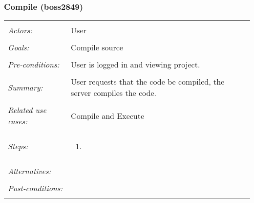 \documentclass[11pt]{article}
\begin{document}
\subsubsection{Compile (boss2849)}
\begin{tabular}{ p{2cm} p{12cm} }
 \hline
 \\
 \textit{Actors:} & User \\ 
 \\
 \textit{Goals:} & Compile source \\
 \\
 \textit{Pre-conditions:} & User is logged in and viewing project. \\
 \\
 \textit{Summary:} & User requests that the code be compiled, the server compiles the code. \\
 \\
 \textit{Related use cases:} & Compile and Execute \\ 
 \\
 \textit{Steps:} & \begin{enumerate}
  \item 
 \end{enumerate} \\
 \\
 \textit{Alternatives:} & \\
 \\
 \textit{Post-conditions:} & \\
 \\
\hline
\end{tabular}
\end{document}
